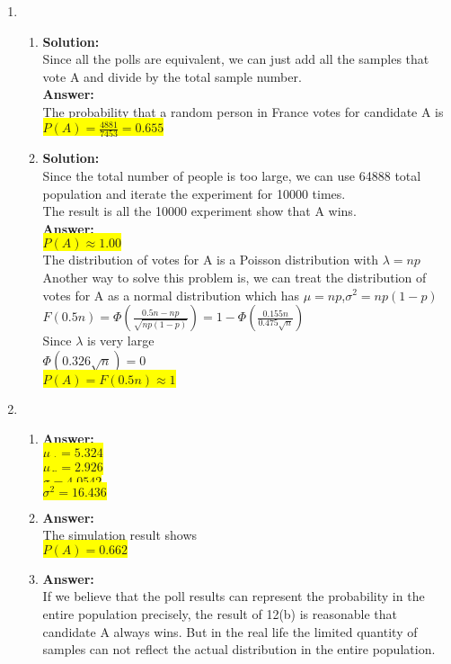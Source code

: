 \documentclass{article}
\newcommand{\myansw}{\textbf{Answer:}\\}
\newcommand{\mysolu}{\textbf{Solution:}\\}
\begin{document}
\begin{enumerate}
\begin{enumerate}
		
		
	\end{enumerate}
	\item
	\begin{enumerate}
		\item
		\mysolu
		Since all the polls are equivalent, we can just add all the samples that vote A and divide by the total sample number.\\
		\myansw
		The probability that a random person in France votes for candidate A is\\
		\colorbox{yellow}{$P(A) = \frac{4881}{7453}=0.655$}\\
		\item
		\mysolu
		Since the total number of people is too large, we can use 64888 total population and iterate the experiment for 10000 times.\\
		The result is all the 10000 experiment show that A wins.\\
		\myansw
		\colorbox{yellow}{$P(A) \approx 1.00$}\\
		The distribution of votes for A is a Poisson distribution with $\lambda = np $\\
		Another way to solve this problem is, we can treat the distribution of votes for A as a normal distribution which has $\mu = np$,$\sigma^2 = np(1-p)$ \\
		$F(0.5n) = \Phi(\frac{0.5n - np}{\sqrt{np(1-p)}}) = 1 - \Phi(\frac{0.155n}{0.475\sqrt{n}})$\\
		Since $\lambda$ is very large\\
		$\Phi(0.326\sqrt{n})=0$\\
		\colorbox{yellow}{$P(A)=F(0.5n) \approx 1$}\\
	\end{enumerate}
	\item
	\begin{enumerate}
		\item
		\myansw
		\colorbox{yellow}{$\mu_A = 5.324$}\\
		\colorbox{yellow}{$\mu_B = 2.926$}\\
		\colorbox{yellow}{$\sigma = 4.0542$}\\
		\colorbox{yellow}{$\sigma^2 = 16.436$}\\
		\item
		\myansw
		The simulation result shows\\
		\colorbox{yellow}{${P(A) = 0.662}$}\\
		\item
		\myansw
		If we believe that the poll results can represent the probability in the entire population precisely, the result of 12(b) is reasonable that candidate A always wins. But in the real life the limited quantity of samples can not reflect the actual distribution in the entire population.\\

\end{enumerate}
\end{enumerate}
\end{document}
